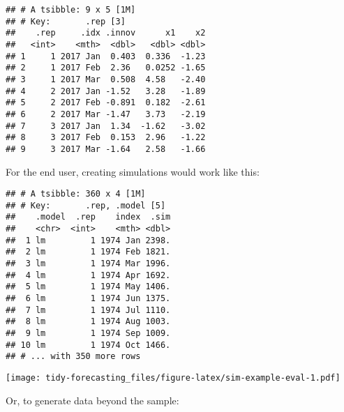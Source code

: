 \documentclass[]{book}
\newenvironment{Shaded}{\begin{snugshade}}{\end{snugshade}}
\newcommand{\DataTypeTok}[1]{\textcolor[rgb]{0.13,0.29,0.53}{#1}}
\newcommand{\DecValTok}[1]{\textcolor[rgb]{0.00,0.00,0.81}{#1}}
\newcommand{\KeywordTok}[1]{\textcolor[rgb]{0.13,0.29,0.53}{\textbf{#1}}}
\newcommand{\NormalTok}[1]{#1}
\newcommand{\OperatorTok}[1]{\textcolor[rgb]{0.81,0.36,0.00}{\textbf{#1}}}
\newcommand{\StringTok}[1]{\textcolor[rgb]{0.31,0.60,0.02}{#1}}
\begin{document}
\begin{verbatim}
## # A tsibble: 9 x 5 [1M]
## # Key:       .rep [3]
##    .rep     .idx .innov      x1    x2
##   <int>    <mth>  <dbl>   <dbl> <dbl>
## 1     1 2017 Jan  0.403  0.336  -1.23
## 2     1 2017 Feb  2.36   0.0252 -1.65
## 3     1 2017 Mar  0.508  4.58   -2.40
## 4     2 2017 Jan -1.52   3.28   -1.89
## 5     2 2017 Feb -0.891  0.182  -2.61
## 6     2 2017 Mar -1.47   3.73   -2.19
## 7     3 2017 Jan  1.34  -1.62   -3.02
## 8     3 2017 Feb  0.153  2.96   -1.22
## 9     3 2017 Mar -1.64   2.58   -1.66
\end{verbatim}

For the end user, creating simulations would work like this:

\begin{Shaded}
\end{Shaded}

\begin{verbatim}
## # A tsibble: 360 x 4 [1M]
## # Key:       .rep, .model [5]
##    .model  .rep    index  .sim
##    <chr>  <int>    <mth> <dbl>
##  1 lm         1 1974 Jan 2398.
##  2 lm         1 1974 Feb 1821.
##  3 lm         1 1974 Mar 1996.
##  4 lm         1 1974 Apr 1692.
##  5 lm         1 1974 May 1406.
##  6 lm         1 1974 Jun 1375.
##  7 lm         1 1974 Jul 1110.
##  8 lm         1 1974 Aug 1003.
##  9 lm         1 1974 Sep 1009.
## 10 lm         1 1974 Oct 1466.
## # ... with 350 more rows
\end{verbatim}

\texttt{[image: tidy-forecasting\_files/figure-latex/sim-example-eval-1.pdf]}

Or, to generate data beyond the sample:
\end{document}
